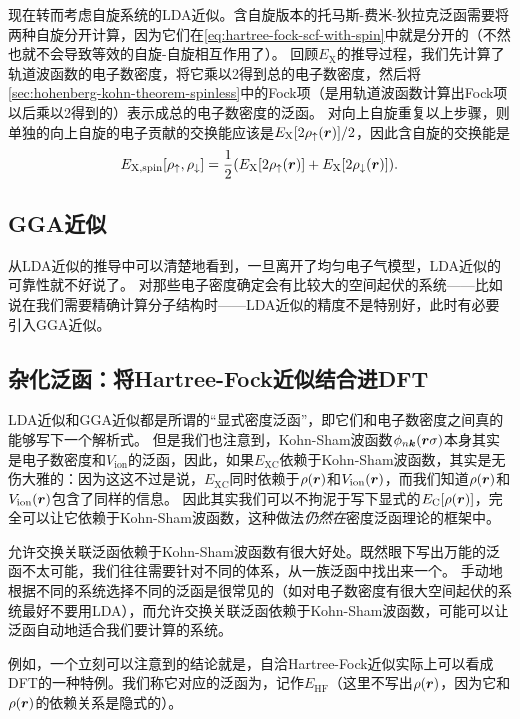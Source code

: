 现在转而考虑自旋系统的LDA近似。含自旋版本的托马斯-费米-狄拉克泛函需要将两种自旋分开计算，因为它们在\eqref{eq:hartree-fock-scf-with-spin}中就是分开的（不然也就不会导致等效的自旋-自旋相互作用了）。
回顾$E_\text{X}$的推导过程，我们先计算了轨道波函数的电子数密度，将它乘以2得到总的电子数密度，然后将\eqref{sec:hohenberg-kohn-theorem-spinless}中的Fock项（是用轨道波函数计算出Fock项以后乘以2得到的）表示成总的电子数密度的泛函。
对向上自旋重复以上步骤，则单独的向上自旋的电子贡献的交换能应该是$E_\text{X}[2 \rho_\uparrow(\vb*{r})] / 2$，因此含自旋的交换能是
\begin{equation}
    E_\text{X,spin}[\rho_\uparrow, \rho_\downarrow] = \frac{1}{2} (E_\text{X}[2 \rho_\uparrow(\vb*{r})] + E_\text{X}[2 \rho_\downarrow(\vb*{r})]).
\end{equation}

\subsection{GGA近似}

从LDA近似的推导中可以清楚地看到，一旦离开了均匀电子气模型，LDA近似的可靠性就不好说了。
对那些电子密度确定会有比较大的空间起伏的系统——比如说在我们需要精确计算分子结构时——LDA近似的精度不是特别好，此时有必要引入GGA近似。

\subsection{杂化泛函：将Hartree-Fock近似结合进DFT}

LDA近似和GGA近似都是所谓的“显式密度泛函”，即它们和电子数密度之间真的能够写下一个解析式。
但是我们也注意到，Kohn-Sham波函数$\phi_{n \vb*{k}}(\vb*{r} \sigma)$本身其实是电子数密度和$V_\text{ion}$的泛函，因此，如果$E_\text{XC}$依赖于Kohn-Sham波函数，其实是无伤大雅的：因为这这不过是说，$E_\text{XC}$同时依赖于$\rho(\vb*{r})$和$V_\text{ion}(\vb*{r})$，而我们知道$\rho(\vb*{r})$和$V_\text{ion}(\vb*{r})$包含了同样的信息。
因此其实我们可以不拘泥于写下显式的$E_\text{C}[\rho(\vb*{r})]$，完全可以让它依赖于Kohn-Sham波函数，这种做法\emph{仍然在}密度泛函理论的框架中。

允许交换关联泛函依赖于Kohn-Sham波函数有很大好处。既然眼下写出万能的泛函不太可能，我们往往需要针对不同的体系，从一族泛函中找出来一个。
手动地根据不同的系统选择不同的泛函是很常见的（如对电子数密度有很大空间起伏的系统最好不要用LDA），而允许交换关联泛函依赖于Kohn-Sham波函数，可能可以让泛函自动地适合我们要计算的系统。

例如，一个立刻可以注意到的结论就是，自洽Hartree-Fock近似实际上可以看成DFT的一种特例。我们称它对应的泛函为，记作$E_\text{HF}$（这里不写出$\rho(\vb*{r})$，因为它和$\rho(\vb*{r})$的依赖关系是隐式的）。

